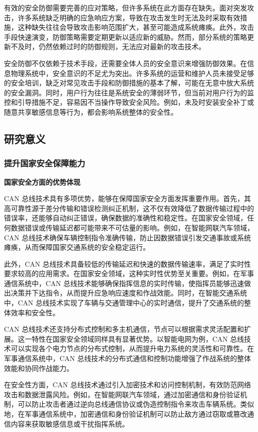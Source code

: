 有效的安全防御需要完善的应对策略，但许多系统在此方面存在缺失。面对突发攻击，许多系统缺乏明确的应急响应方案，导致在攻击发生时无法及时采取有效措施，这种缺失往往会导致攻击影响范围扩大，甚至可能造成系统瘫痪。此外，攻击手段快速演变，防御策略需要定期更新以适应新的威胁。然而，部分系统的策略更新不及时，仍然依赖过时的防御规则，无法应对最新的攻击技术。

安全防御不仅依赖于技术手段，还需要全体人员的安全意识来增强防御效果。在信息物理系统中，安全意识的不足尤为突出。许多系统的运营和维护人员未接受足够的安全培训，缺乏对常见攻击手段和防御措施的基本了解，可能在无意中放大系统的安全漏洞。同时，用户行为往往是系统安全的薄弱环节，但当前对用户行为的监控和引导措施不足，容易因不当操作导致安全风险。例如，未及时安装安全补丁或随意共享敏感信息等行为，都会影响系统整体的安全性。

\subsection{研究意义}

\subsubsection{提升国家安全保障能力}

\textbf{国家安全方面的优势体现}

CAN 总线技术具有多项优势，能够在保障国家安全方面发挥重要作用。首先，其高可靠性源于差分传输和错误检测纠正机制，这不仅有效降低了数据传输过程中的错误率，还能够自动纠正错误，确保数据的准确性和稳定性。在国家安全领域，任何数据错误或传输延迟都可能带来不可估量的影响。例如，在智能网联汽车领域，CAN 总线技术确保车辆控制指令准确传输，防止因数据错误引发交通事故或系统瘫痪，从而保障国家交通系统的安全稳定运行。

此外，CAN 总线技术具备较低的传输延迟和快速的数据传输速率，满足了实时性要求较高的应用需求。在国家安全领域，这种实时性优势至关重要。例如，在军事通信系统中，CAN 总线技术能够确保指挥信息的实时传输，使指挥员能够迅速做出决策并下达指令，从而提升应急响应速度和作战效能。同时，在智能交通系统中，CAN 总线技术实现了车辆与交通管理中心的实时通信，提升了交通系统的整体效率和安全性。

CAN 总线技术还支持分布式控制和多主机通信，节点可以根据需求灵活配置和扩展。这一特性在国家安全领域同样具有显著优势。以智能电网为例，CAN 总线技术可以实现各个电力节点的分布式控制，从而提升电力系统的灵活性和可靠性。在军事通信系统中，CAN 总线技术的分布式通信和控制功能增强了作战系统的整体效能和协同作战能力。

在安全性方面，CAN 总线技术通过引入加密技术和访问控制机制，有效防范网络攻击和数据泄露风险。例如，在智能网联汽车领域，通过加密通信和身份验证机制，可以防止攻击者通过逆向总线通信协议或伪造控制指令来攻击车辆系统。类似地，在军事通信系统中，加密通信和身份验证机制可以防止敌方通过窃取或篡改通信内容来获取敏感信息或干扰指挥系统。

